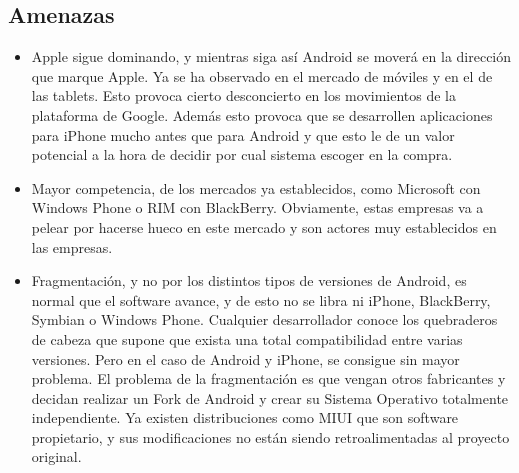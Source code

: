 \documentclass[11pt]{article}
\begin{document}
\subsection{Amenazas}
\begin{itemize}
\item Apple sigue dominando, y mientras siga así Android se moverá en la dirección que marque Apple. Ya se ha observado en el mercado de móviles y en el de las tablets. Esto provoca cierto desconcierto en los movimientos de la plataforma de Google. Además esto provoca que se desarrollen aplicaciones para iPhone mucho antes que para Android y que esto le de un valor potencial a la hora de decidir por cual sistema escoger en la compra.
\item Mayor competencia, de los mercados ya establecidos, como Microsoft con Windows Phone o RIM con BlackBerry. Obviamente, estas empresas va a pelear por hacerse hueco en este mercado y son actores muy establecidos en las empresas.
\item Fragmentación, y no por los distintos tipos de versiones de Android, es normal que el software avance, y de esto no se libra ni iPhone, BlackBerry, Symbian o Windows Phone. Cualquier desarrollador conoce los quebraderos de cabeza que supone que exista una total compatibilidad entre varias versiones. Pero en el caso de Android y iPhone, se consigue sin mayor problema. El problema de la fragmentación es que vengan otros fabricantes y decidan realizar un Fork de Android y crear su Sistema Operativo totalmente independiente. Ya existen distribuciones como MIUI \cite{miui} que son software propietario, y sus modificaciones no están siendo retroalimentadas al proyecto original.
\end{itemize}
\end{document}
